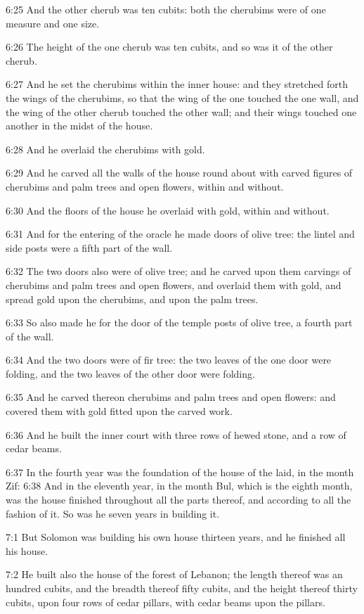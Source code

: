 6:25 And the other cherub was ten cubits: both the cherubims were of
one measure and one size.

6:26 The height of the one cherub was ten cubits, and so was it of the
other cherub.

6:27 And he set the cherubims within the inner house: and they
stretched forth the wings of the cherubims, so that the wing of the
one touched the one wall, and the wing of the other cherub touched the
other wall; and their wings touched one another in the midst of the
house.

6:28 And he overlaid the cherubims with gold.

6:29 And he carved all the walls of the house round about with carved
figures of cherubims and palm trees and open flowers, within and
without.

6:30 And the floors of the house he overlaid with gold, within and
without.

6:31 And for the entering of the oracle he made doors of olive tree:
the lintel and side posts were a fifth part of the wall.

6:32 The two doors also were of olive tree; and he carved upon them
carvings of cherubims and palm trees and open flowers, and overlaid
them with gold, and spread gold upon the cherubims, and upon the palm
trees.

6:33 So also made he for the door of the temple posts of olive tree, a
fourth part of the wall.

6:34 And the two doors were of fir tree: the two leaves of the one
door were folding, and the two leaves of the other door were folding.

6:35 And he carved thereon cherubims and palm trees and open flowers:
and covered them with gold fitted upon the carved work.

6:36 And he built the inner court with three rows of hewed stone, and
a row of cedar beams.

6:37 In the fourth year was the foundation of the house of the \LORD
laid, in the month Zif: 6:38 And in the eleventh year, in the month
Bul, which is the eighth month, was the house finished throughout all
the parts thereof, and according to all the fashion of it. So was he
seven years in building it.

7:1 But Solomon was building his own house thirteen years, and he
finished all his house.

7:2 He built also the house of the forest of Lebanon; the length
thereof was an hundred cubits, and the breadth thereof fifty cubits,
and the height thereof thirty cubits, upon four rows of cedar pillars,
with cedar beams upon the pillars.

